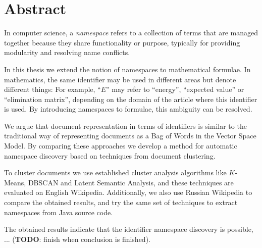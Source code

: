 \section*{Abstract}


In computer science, a \emph{namespace} refers to a collection of
terms that are managed together because they share functionality or
purpose, typically for providing modularity and resolving name conflicts.

In this thesis we extend the notion of namespaces to mathematical formulae.
In mathematics, the same identifier may be used in different areas
but denote different things: For example, ``$E$'' may refer to ``energy'',
``expected value'' or ``elimination matrix'', depending on the domain of the article
where this identifier is used. By introducing namespaces to
formulae, this ambiguity can be resolved. 

We argue that document representation in terms of identifiers is
similar to the traditional way of representing documents as a Bag of Words
in the Vector Space Model. By comparing these approaches we
develop a method for automatic namespace discovery based on techniques from
document clustering.

To cluster documents we use established cluster analysis algorithms like
$K$-Means, DBSCAN and Latent Semantic Analysis, and these techniques
are evaluated on English Wikipedia. Additionally, we also use Russian
Wikipedia to compare the obtained results, and try the same set of
techniques to extract namespaces from Java source code.

The obtained results indicate that the identifier namespace discovery is
possible, ... (\textbf{TODO}: finish when conclusion is finished).
